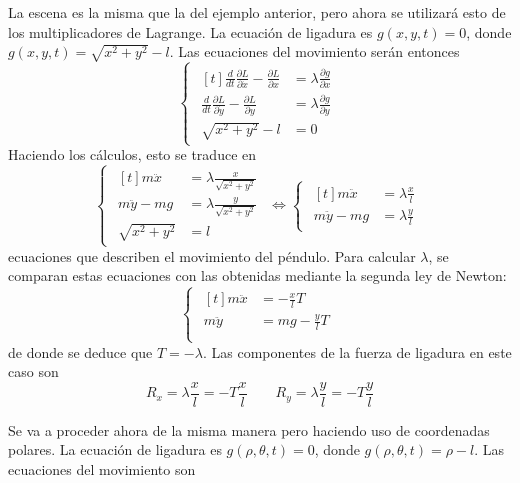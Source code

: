 \documentclass[12pt]{report}
\begin{document}
\begin{example}
La escena es la misma que la del ejemplo anterior, pero ahora se utilizará esto de los multiplicadores de Lagrange. La ecuación de ligadura es $g(x,y,t) = 0$, donde $g(x,y,t) = \sqrt{x^2+y^2}-l$. Las ecuaciones del movimiento serán entonces
\[
\begin{cases}
\begin{aligned}[t]
\frac{d}{dt}\frac{\partial L}{\partial \dot{x}}-\frac{\partial L}{\partial x} &= \lambda \frac{\partial g}{\partial x} \\[5pt]
\frac{d}{dt}\frac{\partial L}{\partial \dot{y}}-\frac{\partial L}{\partial y} &= \lambda \frac{\partial g}{\partial y} \\[5pt]
\sqrt{x^2+y^2} - l &= 0
\end{aligned}
\end{cases}
\]
Haciendo los cálculos, esto se traduce en
\[
\begin{cases}
\begin{aligned}[t]
m\ddot{x} &= \lambda \frac{x}{\sqrt{x^2+y^2}} \\[5pt]
m\ddot{y}-mg &= \lambda \frac{y}{\sqrt{x^2+y^2}} \\[5pt]
\sqrt{x^2+y^2} &= l
\end{aligned}
\end{cases}
\iff 
\begin{cases}
\begin{aligned}[t]
m\ddot{x} &= \lambda \frac{x}{l} \\[5pt]
m\ddot{y}-mg &= \lambda \frac{y}{l}
\end{aligned}
\end{cases}
\]
ecuaciones que describen el movimiento del péndulo. Para calcular $\lambda$, se comparan estas ecuaciones con las obtenidas mediante la segunda ley de Newton:
\[
\begin{cases}
\begin{aligned}[t]
m\ddot{x} &= -\frac{x}{l}T  \\[5pt]
m\ddot{y}&= mg-\frac{y}{l} T \\[5pt]
\end{aligned}
\end{cases}
\]
de donde se deduce que $T = -\lambda $. Las componentes de la fuerza de ligadura en este caso son
\[R_x = \lambda \frac{x}{l} = -T \frac{x}{l} \qquad R_y = \lambda \frac{y}{l} = -T \frac{y}{l}\]

\vspace{2mm}
Se va a proceder ahora de la misma manera pero haciendo uso de coordenadas polares. La ecuación de ligadura es $g(\rho,\theta,t) = 0$, donde $g(\rho,\theta,t) = \rho-l$. Las ecuaciones del movimiento son


\end{example}
\end{document}
